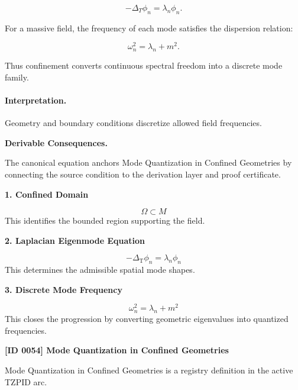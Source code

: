 \begin{equation}
-\Delta_T \phi_n = \lambda_n\phi_n .
\end{equation}

For a massive field, the frequency of each mode satisfies the dispersion relation:

\begin{equation}
\omega_n^2=\lambda_n+m^2 .
\end{equation}

Thus confinement converts continuous spectral freedom into a discrete mode family.

\paragraph{Interpretation.}
Geometry and boundary conditions discretize allowed field frequencies.

\par\vspace{0.35em}
\noindent\textbf{Derivable Consequences.}\quad
\begingroup
\footnotesize
\raggedright
The canonical equation anchors Mode Quantization in Confined Geometries by connecting the source condition to the derivation layer and proof certificate.
\par\endgroup

\noindent\textbf{1. Confined Domain}\par
\[
\Omega \subset M
\]
\noindent This identifies the bounded region supporting the field.\par
\noindent\textbf{2. Laplacian Eigenmode Equation}\par
\[
-\Delta_{\mathrm{T}}\phi_{n}
=
\lambda_{n}\phi_{n}
\]
\noindent This determines the admissible spatial mode shapes.\par
\noindent\textbf{3. Discrete Mode Frequency}\par
\[
\omega_{n}^{2} = \lambda_{n} + m^{2}
\]
\noindent This closes the progression by converting geometric eigenvalues into quantized frequencies.\par

\clearpage
\noindent\textbf{[ID 0054] Mode Quantization in Confined Geometries}\par
\vspace{0.35em}
\begingroup\small
{}
Mode Quantization in Confined Geometries is a registry definition in the active TZPID arc.

